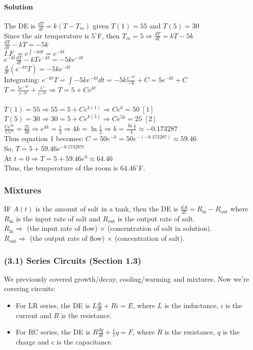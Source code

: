 \documentclass{article}
\newcommand{\dg}{^{\circ}}
\begin{document}
\paragraph{Solution} The DE is $\frac{dT}{dt}=k(T-T_m)$ given $T(1)=55$ and $T(5)=30$
\\Since the air temperature is $5\dg$F, then $T_m=5\Rightarrow\frac{dT}{dt}=kT-5k$
\\$\frac{dT}{dt}-kT=-5k$
\\$I.F.=e^{\int-kdt}=e^{-kt}$
\\$e^{-kt}\frac{dT}{dt}-kTe^{-kt}=-5ke^{-kt}$
\\$\frac{d}{dt}(e^{-kt}T)=-5ke^{-kt}$
\\Integrating: $e^{-kt}T=\int-5ke^{-kt}dt=-5k\frac{e^{-kt}}{-k}+C=5e^{-kt}+C$
\\$T=\frac{5e^{-kt}}{e^{-kt}}+\frac{C}{e^{-kt}}\Rightarrow T=5+Ce^{kt}$
\\\\$T(1)=55\Rightarrow55=5+Ce^{k(1)}\Rightarrow Ce^k=50\;[1]$
\\$T(5)=30\Rightarrow30=5+Ce^{k(5)}\Rightarrow Ce^{5k}=25\;[2]$
\\$\frac{Ce^{5k}}{Ce^k}=\frac{25}{50}\Rightarrow e^{4k}=\frac{1}{2}\Rightarrow 4k=\ln\frac{1}{2}\Rightarrow k=\frac{\ln\frac{1}{2}}{4}\approx-0.173287$
\\Thus equation 1 becomes: $C=50e^{-k}=50e^{-(-0.173287)}\approx59.46$
\\So, $T=5+59.46e^{-0.173287t}$
\\At $t=0\Rightarrow T=5+59.46e^0\approx64.46$
\\Thus, the temperature of the room is $64.46\dg$F.


\subsubsection{Mixtures}
IF $A(t)$ is the amount of salt in a tank, then the DE is $\frac{dA}{dt}=R_{\text{in}}-R_{\text{out}}$
where $R_{\text{in}}$ is the input rate of salt and $R_{\text{out}}$ is the output rate of salt.
\\$R_{\text{in}}\Rightarrow$ (the input rate of flow) $\times$ (concentration of salt in solution).
\\$R_{\text{out}}\Rightarrow$ (the output rate of flow) $\times$ (concentration of salt).

\subsubsection{(3.1) Series Circuits (Section 1.3)}
We previously covered growth/decay, cooling/warming and mixtures. Now we're covering circuits:
\begin{itemize}
    \itemsep 0em
    \item For LR series, the DE is $L\frac{di}{dt}+Ri=E$, where $L$ is the inductance, $i$ is the current and $R$ is the resistance.
    \item For RC series, the DE is $R\frac{dq}{dt}+\frac{1}{c}q=F$, where $R$ is the resistance, $q$ is the charge and $c$ is the capacitance.
\end{itemize}
\end{document}
